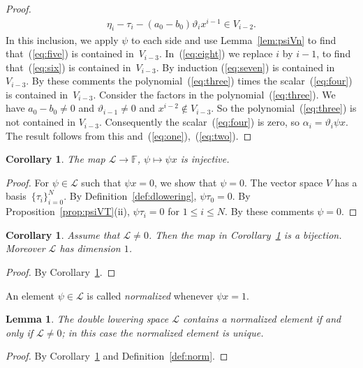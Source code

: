 \documentclass[pdftex]{sigma}
\numberwithin{equation}{section}
\newtheorem{Corollary}[Theorem]{Corollary}
\newtheorem{Lemma}[Theorem]{Lemma}
\begin{document}
\begin{proof}
\begin{gather}
\eta_i - \tau_i - (a_0 - b_0)\vartheta_i x^{i-1} \in V_{i-2}.
\label{eq:eight}
\end{gather}
In this inclusion, we apply $\psi$ to each side and use
Lemma~\ref{lem:psiVn}
to find that~(\ref{eq:five}) is contained in~$V_{i-3}$.
In~(\ref{eq:eight}) we replace
$i$ by $i-1$, to find that~(\ref{eq:six}) is contained in~$V_{i-3}$.
By induction (\ref{eq:seven}) is contained in~$V_{i-3}$.
By these comments the polynomial~(\ref{eq:three}) times the scalar~(\ref{eq:four}) is
contained in~$V_{i-3}$.
Consider the factors in the polynomial~(\ref{eq:three}).
We have
$a_0 - b_0 \not=0$ and
$\vartheta_{i-1} \not=0$ and
$x^{i-2} \not\in V_{i-3}$.
So the polynomial~(\ref{eq:three})
is not contained in $V_{i-3}$. Consequently the scalar~(\ref{eq:four}) is zero, so
$\alpha_i = \vartheta_i \psi x$.
The result follows from this
and~(\ref{eq:one}),~(\ref{eq:two}).
\end{proof}

\begin{Corollary}\label{cor:psiL}
The map $\mathcal L \to \mathbb F$, $\psi \mapsto \psi x $ is injective.
\end{Corollary}
\begin{proof}
For $\psi \in \mathcal L$ such that $\psi x=0$,
we show that $\psi=0$.
The vector space $V$ has a basis~$\lbrace \tau_i \rbrace_{i=0}^N$.
By Definition~\ref{def:dlowering},
$\psi \tau_0=0$.
By Proposition~\ref{prop:psiVT}(ii), $\psi \tau_i=0$ for $1 \leq i \leq N$.
By these comments $\psi=0$.
\end{proof}

\begin{Corollary}\label{cor:L01}
Assume that $\mathcal L\not=0$. Then
the map in Corollary~{\rm \ref{cor:psiL}} is a bijection.
 Moreover $\mathcal L$ has dimension $1$.
\end{Corollary}
\begin{proof} By Corollary~\ref{cor:psiL}.
\end{proof}

\begin{Definition}\label{def:norm}
An element $\psi \in \mathcal L$ is called {\it normalized}
whenever $\psi x=1$.
\end{Definition}

\begin{Lemma}\label{lem:norm}
The double lowering space
$\mathcal L$ contains a normalized element if and only
if
$\mathcal L \not=0$; in this case
the normalized element is unique.
\end{Lemma}
\begin{proof} By Corollary~\ref{cor:L01}
and Definition~\ref{def:norm}.
\end{proof}
\end{document}
